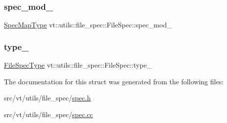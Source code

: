 \mbox{\label{structvt_1_1utils_1_1file__spec_1_1_file_spec_abfe003275eb54e3406a1334e46c15eea}} 
\subsubsection{\texorpdfstring{spec\+\_\+mod\+\_\+}{spec\_mod\_}}
{\footnotesize\ttfamily \hyperlink{structvt_1_1utils_1_1file__spec_1_1_file_spec_a368a4ab8bf689e0b533abac71ae9393b}{Spec\+Map\+Type} vt\+::utils\+::file\+\_\+spec\+::\+File\+Spec\+::spec\+\_\+mod\+\_\+\hspace{0.3cm}{\ttfamily [private]}}

\mbox{\label{structvt_1_1utils_1_1file__spec_1_1_file_spec_aa3e8f2e2f3d7cb7b33bdbbab31331cba}} 
\subsubsection{\texorpdfstring{type\+\_\+}{type\_}}
{\footnotesize\ttfamily \hyperlink{namespacevt_1_1utils_1_1file__spec_adc8912eb2949ca15d0f29afc0342f71e}{File\+Spec\+Type} vt\+::utils\+::file\+\_\+spec\+::\+File\+Spec\+::type\+\_\+\hspace{0.3cm}{\ttfamily [private]}}



The documentation for this struct was generated from the following files\+:\begin{DoxyCompactItemize}
\item 
src/vt/utils/file\+\_\+spec/\hyperlink{spec_8h}{spec.\+h}\item 
src/vt/utils/file\+\_\+spec/\hyperlink{spec_8cc}{spec.\+cc}\end{DoxyCompactItemize}
